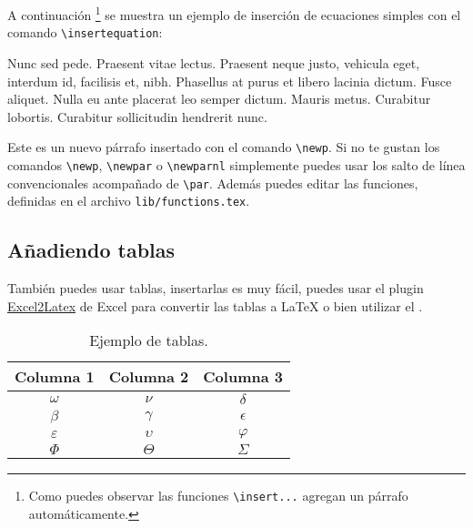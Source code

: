 		A continuación \footnote{Como puedes observar las funciones \texttt{\textbackslash insert...} agregan un párrafo automáticamente.} se muestra un ejemplo de inserción de ecuaciones simples con el comando \texttt{\textbackslash insertequation}:
		
		
		Nunc sed pede. Praesent vitae lectus. Praesent neque justo, vehicula eget, interdum id, facilisis et, nibh. Phasellus at purus et libero lacinia dictum. Fusce aliquet. Nulla eu ante placerat leo semper dictum. Mauris metus. Curabitur lobortis. Curabitur sollicitudin hendrerit nunc.
		
		\newp Este es un nuevo párrafo insertado con el comando \texttt{\textbackslash newp}. Si no te gustan los comandos \texttt{\textbackslash newp}, \texttt{\textbackslash newpar} o \texttt{\textbackslash newparnl} simplemente puedes usar los salto de línea convencionales acompañado de \texttt{\textbackslash par}. Además puedes editar las funciones, definidas en el archivo \texttt{lib/functions.tex}.
		
	\subsection{Añadiendo tablas}
		
		\newp También puedes usar tablas, insertarlas es muy fácil, puedes usar el plugin \href{https://www.ctan.org/tex-archive/support/excel2latex/}{Excel2Latex} \cite{ref2} de Excel para convertir las tablas a \LaTeX\xspace o bien utilizar el  \cite{ref3}.
		
		\begin{table}[htbp]
			\centering
			\caption{Ejemplo de tablas.}
			\begin{tabular}{ccc}
				\hline
				\textbf{Columna 1} & \textbf{Columna 2} & \textbf{Columna 3} \bigstrut\\
				\hline
				$\omega$ & $\nu$ & $\delta$ \bigstrut[t]\\
				$\beta$ & $\gamma$ & $\epsilon$ \\
				$\varepsilon$ & $\upsilon$ & $\varphi$\\
				$\Phi$ & $\Theta$ & $\varSigma$ \bigstrut[b]\\
				\hline
			\end{tabular}
			\label{tab:tabla-1}
		\end{table}


